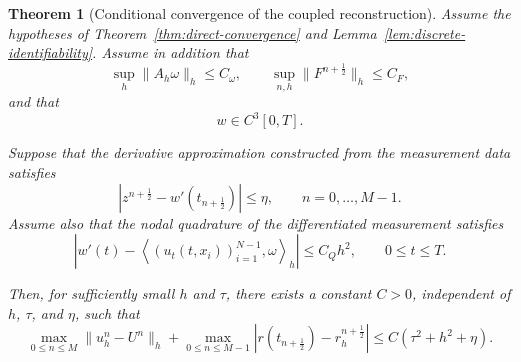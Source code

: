\documentclass[10pt,a4paper]{amsart}
\newtheorem{theorem}{Theorem}
\begin{document}
\begin{theorem}[Conditional convergence of the coupled reconstruction]
\label{thm:inverse-convergence}
Assume the hypotheses of
Theorem~\ref{thm:direct-convergence} and
Lemma~\ref{lem:discrete-identifiability}.
Assume in addition that
\begin{equation}
\sup_h\|A_h\omega\|_h\le C_\omega,
\qquad
\sup_{n,h}\|F^{n+\frac12}\|_h\le C_F,
\label{eq:inverse-uniform-bounds}
\end{equation}
and that
\[
w\in C^3[0,T].
\]

Suppose that the derivative approximation constructed from the
measurement data satisfies
\begin{equation}
\left|
z^{n+\frac12}
-
w'(t_{n+\frac12})
\right|
\le
\eta,
\qquad
n=0,\ldots,M-1.
\label{eq:derivative-error-revised}
\end{equation}
Assume also that the nodal quadrature of the differentiated
measurement satisfies
\begin{equation}
\left|
w'(t)
-
\left\langle
(u_t(t,x_i))_{i=1}^{N-1},
\omega
\right\rangle_h
\right|
\le
C_Qh^2,
\qquad
0\le t\le T.
\label{eq:measurement-quadrature-revised}
\end{equation}

Then, for sufficiently small \(h\) and \(\tau\), there exists a
constant \(C>0\), independent of \(h\), \(\tau\), and \(\eta\), such
that
\begin{equation}
\max_{0\le n\le M}
\|u_h^n-U^n\|_h
+
\max_{0\le n\le M-1}
\left|
r(t_{n+\frac12})
-
r_h^{n+\frac12}
\right|
\le
C(\tau^2+h^2+\eta).
\label{eq:coupled-convergence-revised}
\end{equation}
\end{theorem}
\end{document}
